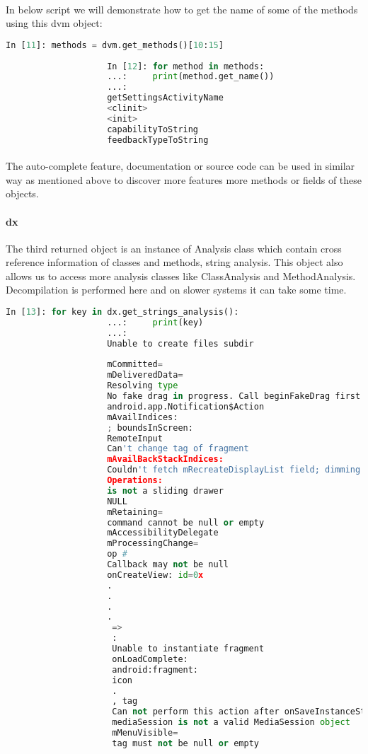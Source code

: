 \documentclass[../main.tex]{subfile}
\begin{document}
			\paragraph{} In below script we will demonstrate how to get the name of some of the methods using this dvm object:
				\begin{lstlisting}[language=python, firstnumber=41]
					In [11]: methods = dvm.get_methods()[10:15]
					
					In [12]: for method in methods:
					...:     print(method.get_name())
					...:     
					getSettingsActivityName
					<clinit>
					<init>
					capabilityToString
					feedbackTypeToString
				\end{lstlisting}
				
			\paragraph{} The auto-complete feature, documentation or source code can be used in similar way as mentioned above to discover more features more methods or fields of these objects.
			\paragraph{dx} The third returned object is an instance of Analysis class which contain cross reference information of classes and methods, string analysis. This object also allows us to access more analysis classes like ClassAnalysis and MethodAnalysis. Decompilation is performed here and on slower systems it can take some time.
				\begin{lstlisting}[language=python, firstnumber=51]
					In [13]: for key in dx.get_strings_analysis():
					...:     print(key)
					...:     
					Unable to create files subdir 
					
					mCommitted=
					mDeliveredData=
					Resolving type 
					No fake drag in progress. Call beginFakeDrag first.
					android.app.Notification$Action
					mAvailIndices: 
					; boundsInScreen: 
					RemoteInput
					Can't change tag of fragment 
					mAvailBackStackIndices: 
					Couldn't fetch mRecreateDisplayList field; dimming will be slow.
					Operations:
					is not a sliding drawer
					NULL
					mRetaining=
					command cannot be null or empty
					mAccessibilityDelegate
					mProcessingChange=
					op #
					Callback may not be null
					onCreateView: id=0x
					.
					.
					.
					.
					 => 
					 : 
					 Unable to instantiate fragment 
					 onLoadComplete: 
					 android:fragment:
					 icon
					 .
					 , tag 
					 Can not perform this action after onSaveInstanceState
					 mediaSession is not a valid MediaSession object
					 mMenuVisible=
					 tag must not be null or empty
					 
				\end{lstlisting}
\end{document}
